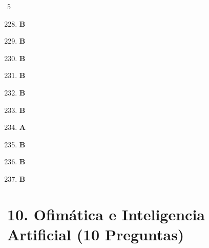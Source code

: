 \documentclass[10pt,a4paper]{article}
\begin{document}
\vspace{0.4cm}
\begin{tcolorbox}[colback=gray!5!white,colframe=gray!60!black,title=\textbf{CLAVE DE RESPUESTAS -- ESTADÍSTICA Y PROBABILIDAD}]
\begin{multicols}{5}
\begin{enumerate}[label=\textbf{\arabic*.}]
\setcounter{enumi}{227}
  \item \textbf{B}
  \item \textbf{B}
  \item \textbf{B}
  \item \textbf{B}
  \item \textbf{B}
  \item \textbf{B}
  \item \textbf{A}
  \item \textbf{B}
  \item \textbf{B}
  \item \textbf{B}
\end{enumerate}
\end{multicols}
\end{tcolorbox}
\newpage\n
\section{10. Ofimática e Inteligencia Artificial (10 Preguntas)}
\end{document}

